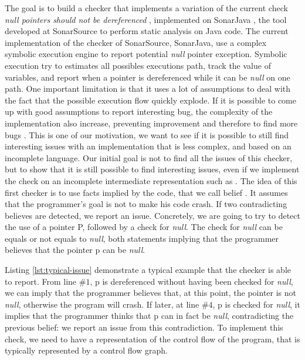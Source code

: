 The goal is to build a checker that implements a variation of the current check \emph{null pointers should not be dereferenced} \cite{RSPEC-2259:2019:Online}, implemented on SonarJava \cite{SonarJava:2019:Online}, the tool developed at SonarSource to perform static analysis on Java code.
The current implementation of the checker of SonarSource, SonarJava, use a complex symbolic execution engine to report potential \emph{null} pointer exception.
Symbolic execution try to estimates all possibles executions path, track the value of variables, and report when a pointer is dereferenced while it can be \emph{null} on one path.
One important limitation is that it uses a lot of assumptions to deal with the fact that the possible execution flow quickly explode. 
If it is possible to come up with good assumptions to report interesting bug, the complexity of the implementation also increase, preventing improvement and therefore to find more bugs \cite{Brown:2016:BSC:2954679.2872364}. 
This is one of our motivation, we want to see if it is possible to still find interesting issues with an implementation that is less complex, and based on an incomplete language.
Our initial goal is not to find all the issues of this checker, but to show that it is still possible to find interesting issues, even if we implement the check on an incomplete intermediate representation such as \slang{}.
The idea of this first checker is to use facts implied by the code, that we call belief \cite{Engler:2001:BDB:502059.502041}.
It assumes that the programmer’s goal is not to make his code crash. If two contradicting believes are detected, we report an issue.
Concretely, we are going to try to detect the use of a pointer P, followed by a check for \emph{null}. The check for \emph{null} can be equals or not equals to \emph{null}, both statements implying that the programmer believes that the pointer p can be \emph{null}.



Listing \ref{lst:typical-issue} demonstrate a typical example that the checker is able to report. 
From line $\#1$, p is dereferenced without having been checked for \emph{null}, we can imply that the programmer believes that, at this point, the pointer is not \emph{null}, otherwise the program will crash. 
If later, at line $\#4$, p is checked for \emph{null}, it implies that the programmer thinks that p can in fact be \emph{null}, contradicting the previous belief: we report an issue from this contradiction.
To implement this check, we need to have a representation of the control flow of the program, that is typically represented by a control flow graph.

